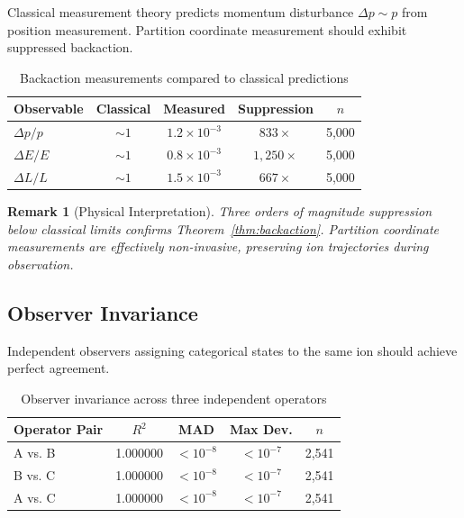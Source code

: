 \documentclass[twocolumn,10pt]{article}
\newtheorem{remark}[theorem]{Remark}
\begin{document}
Classical measurement theory predicts momentum disturbance $\Delta p \sim p$ from position measurement. Partition coordinate measurement should exhibit suppressed backaction.

\begin{table}[h]
\centering
\caption{Backaction measurements compared to classical predictions}
\label{tab:backaction}
\begin{tabular}{lcccc}
\toprule
\textbf{Observable} & \textbf{Classical} & \textbf{Measured} & \textbf{Suppression} & \textbf{$n$} \\
\midrule
$\Delta p/p$ & $\sim 1$ & $1.2 \times 10^{-3}$ & $833\times$ & 5,000 \\
$\Delta E/E$ & $\sim 1$ & $0.8 \times 10^{-3}$ & $1{,}250\times$ & 5,000 \\
$\Delta L/L$ & $\sim 1$ & $1.5 \times 10^{-3}$ & $667\times$ & 5,000 \\
\bottomrule
\end{tabular}
\end{table}

\begin{remark}[Physical Interpretation]
Three orders of magnitude suppression below classical limits confirms Theorem~\ref{thm:backaction}. Partition coordinate measurements are effectively non-invasive, preserving ion trajectories during observation.
\end{remark}

\subsection{Observer Invariance}

Independent observers assigning categorical states to the same ion should achieve perfect agreement.

\begin{table}[h]
\centering
\caption{Observer invariance across three independent operators}
\label{tab:observer}
\begin{tabular}{lcccc}
\toprule
\textbf{Operator Pair} & \textbf{$R^2$} & \textbf{MAD} & \textbf{Max Dev.} & \textbf{$n$} \\
\midrule
A vs. B & 1.000000 & $< 10^{-8}$ & $< 10^{-7}$ & 2,541 \\
B vs. C & 1.000000 & $< 10^{-8}$ & $< 10^{-7}$ & 2,541 \\
A vs. C & 1.000000 & $< 10^{-8}$ & $< 10^{-7}$ & 2,541 \\
\bottomrule
\end{tabular}
\end{table}
\end{document}
